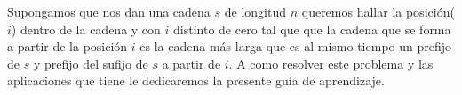 Supongamos que nos dan una cadena $s$ de longitud $n$  queremos hallar la posición($i$) dentro de la cadena  y con $i$ distinto de cero tal que que la cadena que se forma a partir de la posición $i$ es la cadena más larga que es al mismo tiempo un prefijo de $s$ y prefijo del sufijo de $s$ a partir de $i$. A como resolver este problema y las aplicaciones que tiene le dedicaremos la presente guía de aprendizaje.

